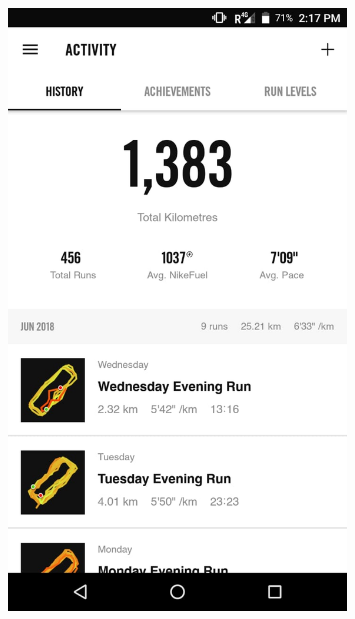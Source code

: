 \documentclass[]{article}
\begin{document}
\begin{figure}
	\includegraphics[width=0.8\textwidth]{running/1000}
\end{figure}
\end{document}
